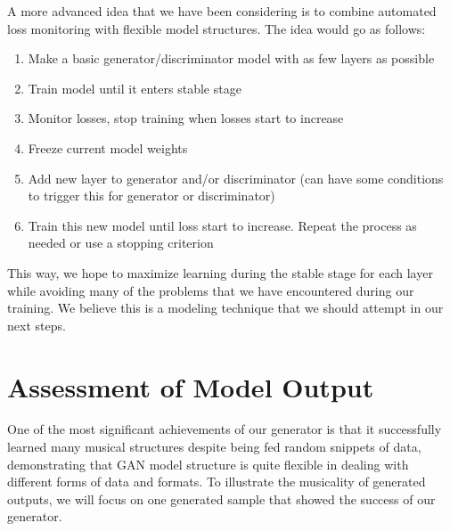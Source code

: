 \documentclass[12pt,oneside]{chicagocapstone}
\providecommand{\tightlist}{%
  \setlength{\itemsep}{0pt}\setlength{\parskip}{0pt}}
\begin{document}
A more advanced idea that we have been considering is to combine automated loss monitoring with flexible model structures. The idea would go as follows:
\begin{enumerate}
\def\labelenumi{\arabic{enumi}.}
\tightlist
\item
  Make a basic generator/discriminator model with as few layers as possible
\item
  Train model until it enters stable stage
\item
  Monitor losses, stop training when losses start to increase
\item
  Freeze current model weights
\item
  Add new layer to generator and/or discriminator (can have some conditions to trigger this for generator or discriminator)
\item
  Train this new model until loss start to increase. Repeat the process as needed or use a stopping criterion
\end{enumerate}
This way, we hope to maximize learning during the stable stage for each layer while avoiding many of the problems that we have encountered during our training. We believe this is a modeling technique that we should attempt in our next steps.

\hypertarget{findings-assess_model}{%
\section*{Assessment of Model Output}\label{findings-assess_model}}

One of the most significant achievements of our generator is that it successfully learned many musical structures despite being fed random snippets of data, demonstrating that GAN model structure is quite flexible in dealing with different forms of data and formats. To illustrate the musicality of generated outputs, we will focus on one generated sample that showed the success of our generator.
\end{document}
